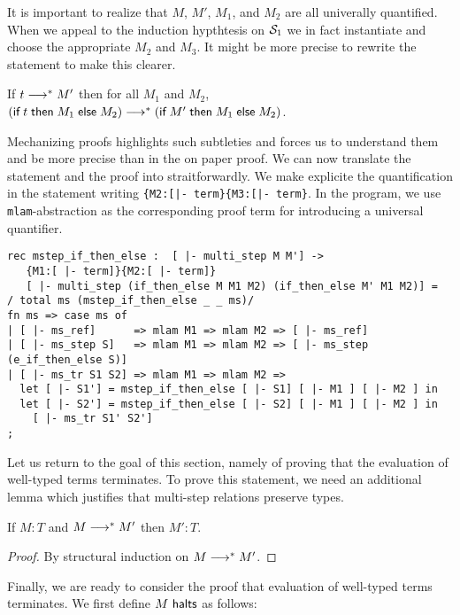 It is important to realize that $M$, $M'$, $M_1$, and $M_2$ are all
univerally quantified.  When we appeal to the induction hypthtesis on
$\S_1$ we in fact instantiate and choose the appropriate $M_2$ and
$M_3$. It might be more precise to rewrite the statement to make this clearer.

\begin{center}
If $t \MSteps M'$ then for all $M_1$ and $M_2$, $(\tmif t {M_1} {M_2}) \MSteps (\tmif {M'} {M_1} {M_2})$.
\end{center}

Mechanizing proofs highlights such subtleties and forces us to
understand them and be more precise than in the on paper proof. We can
now translate the statement and the proof into
\beluga straitforwardly. We make explicite the quantification in the
statement writing \lstinline!{M2:[|- term}{M3:[|- term}!. In the
program, we use \lstinline!mlam!-abstraction as the corresponding
proof term for introducing a universal quantifier.

\begin{lstlisting}
rec mstep_if_then_else :  [ |- multi_step M M'] ->
   {M1:[ |- term]}{M2:[ |- term]}
   [ |- multi_step (if_then_else M M1 M2) (if_then_else M' M1 M2)] =
/ total ms (mstep_if_then_else _ _ ms)/
fn ms => case ms of
| [ |- ms_ref]      => mlam M1 => mlam M2 => [ |- ms_ref]
| [ |- ms_step S]   => mlam M1 => mlam M2 => [ |- ms_step (e_if_then_else S)]
| [ |- ms_tr S1 S2] => mlam M1 => mlam M2 =>
  let [ |- S1'] = mstep_if_then_else [ |- S1] [ |- M1 ] [ |- M2 ] in
  let [ |- S2'] = mstep_if_then_else [ |- S2] [ |- M1 ] [ |- M2 ] in
    [ |- ms_tr S1' S2']
;
\end{lstlisting}


Let us return to the goal of this section, namely of proving that the
evaluation of well-typed terms terminates. To prove this statement, we
need an additional lemma which justifies that multi-step relations
preserve types.

\begin{lemma}
If $M : T$ and $M \MSteps M'$ then $M':T$.
\end{lemma}
\begin{proof}
By structural induction on $M \MSteps M'$.
\end{proof}

Finally, we are ready to consider the proof that evaluation of well-typed terms
terminates. We first define $M \Halts$ as follows:

